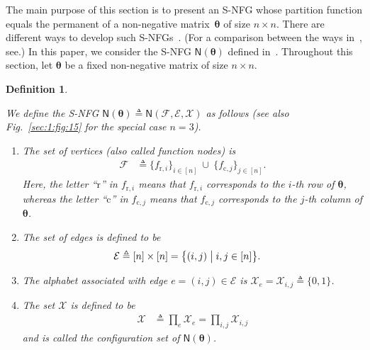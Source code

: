 \documentclass[journal,lettersize,twocolumn]{IEEEtran} %
\newtheorem{definition}[theorem]{Definition}
\newcommand{\set}[1]{\mathcal{#1}}
\newcommand{\setEfull}{ \mathcal{E} }
\newcommand{\setF}{ \mathcal{F} }
\newcommand{\sfN}{ \mathsf{N} }
\newcommand{\matr}[1]{ \bm{#1} }
\newcommand{\defeq}{ \triangleq }
\newcommand{\fr}[1]{ f_{ \mathrm{r}, #1 } }
\newcommand{\fc}[1]{ f_{ \mathrm{c}, #1 } }
\newcommand{\setx}[1]{ \set{X}_{#1} }
\newcommand{\mtheta}{\matr{\theta}}
\begin{document}
%

The main purpose of this section is to present an S-NFG whose partition
function equals the permanent of a non-negative matrix~$\mtheta$ of size
$n \times n$. There are different ways to develop such
S-NFGs~\cite{Greenhill2010, Vontobel2013a}. (For a comparison between the ways
in~\cite{Greenhill2010, Vontobel2013a}, see\cite[Section
VII-E]{Vontobel2013a}.) In this paper, we consider the S-NFG $ \sfN(\mtheta) $
defined in~\cite{Vontobel2013a}. Throughout this section, let $\mtheta$ be a
fixed non-negative matrix of size $n \times n$.

%

\begin{definition}
  \label{sec:1:def:5}
  \label{def: details of S-NFG of permanent}

  We define the S-NFG
  $ \sfN(\mtheta) \defeq \sfN( \setF, \setEfull, \set{X}) $ as follows (see
  also Fig.~\ref{sec:1:fig:15} for the special case $n = 3$).
  \begin{enumerate}

  \item The set of vertices (also called function nodes) is
    \begin{align*}
      \set{F}
        &\defeq
           \{ \fr{i} \}_{i \in [n]} 
           \ \cup \ 
           \{ \fc{j} \}_{j \in [n]}.
    \end{align*}
    Here, the letter ``$\mathrm{r}$'' in $ \fr{i} $ means that $ \fr{i} $
    corresponds to the $ i $-th row of $\mtheta$, whereas the letter
    ``$\mathrm{c}$'' in $ \fc{j} $ means that $ \fc{j} $ corresponds to the
    $ j $-th column of $\mtheta$.

  \item The set of edges is defined to be
    \begin{align*}
      \setEfull
        &\defeq
           [n] \times [n] 
          = \bigl\{ 
              (i,j) 
            \bigm|
              i , j \in [n] 
            \bigr\}.
    \end{align*}

  \item The alphabet associated with edge $ e = (i,j) \in \setEfull $ is
    $ \setx{e} = \setx{i,j} \defeq \{0,1\} $.  

  \item The set $ \set{X} $ is defined to be
    \begin{align*}
      \set{X}
        &\defeq
           \prod_{e}
             \setx{e} 
         = \prod_{i,j}
             \setx{i,j}
    \end{align*}
    and is called the configuration set of $ \sfN(\mtheta) $.


\end{enumerate}
\end{definition}
\end{document}
